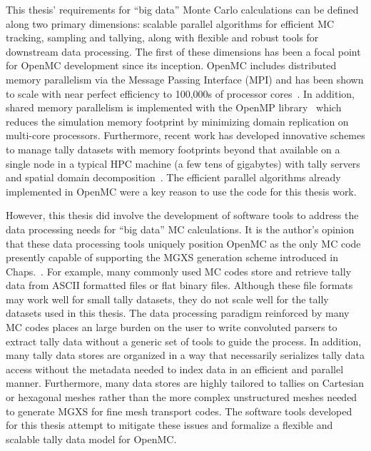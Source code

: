 This thesis' requirements for ``big data'' Monte Carlo calculations can be defined along two primary dimensions: scalable parallel algorithms for efficient \ac{MC} tracking, sampling and tallying, along with flexible and robust tools for downstream data processing. The first of these dimensions has been a focal point for OpenMC development since its inception. OpenMC includes distributed memory parallelism via the Message Passing Interface (MPI) and has been shown to scale with near perfect efficiency to 100,000s of processor cores~\cite{romano2013parallel}. In addition, shared memory parallelism is implemented with the OpenMP library~\cite{siegel2014multi} which reduces the simulation memory footprint by minimizing domain replication on multi-core processors. Furthermore, recent work has developed innovative schemes to manage tally datasets with memory footprints beyond that available on a single node in a typical \ac{HPC} machine (a few tens of gigabytes) with tally servers~\cite{romano2013servers} and spatial domain decomposition~\cite{horelik2014dd}. The efficient parallel algorithms already implemented in OpenMC were a key reason to use the code for this thesis work.

However, this thesis did involve the development of software tools to address the data processing needs for ``big data'' \ac{MC} calculations. It is the author's opinion that these data processing tools uniquely position OpenMC as the only \ac{MC} code presently capable of supporting the \ac{MGXS} generation scheme introduced in Chaps.~. For example, many commonly used \ac{MC} codes store and retrieve tally data from \ac{ASCII} formatted files or flat binary files. Although these file formats may work well for small tally datasets, they do not scale well for the tally datasets used in this thesis. The data processing paradigm reinforced by many \ac{MC} codes places an large burden on the user to write convoluted parsers to extract tally data without a generic set of tools to guide the process. In addition, many tally data stores are organized in a way that necessarily serializes tally data access without the metadata needed to index data in an efficient and parallel manner. Furthermore, many data stores are highly tailored to tallies on Cartesian or hexagonal meshes rather than the more complex unstructured meshes needed to generate \ac{MGXS} for fine mesh transport codes. The software tools developed for this thesis attempt to mitigate these issues and formalize a flexible and scalable tally data model for OpenMC.

